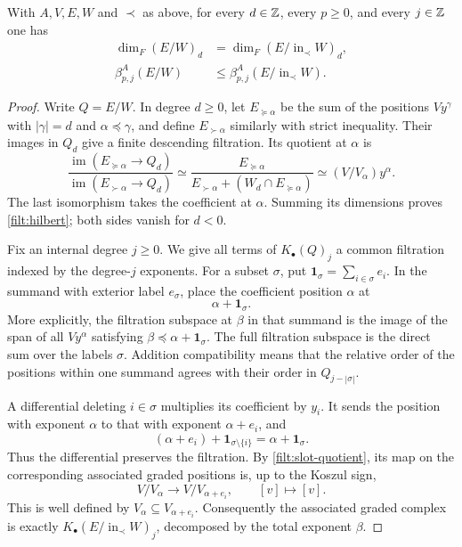 \begin{proposition}
\label{filt:comparison}
\label{filt:initial}
With $A,V,E,W$ and $\prec$ as above, for every $d\in\mathbb Z$, every
$p\geq0$, and every $j\in\mathbb Z$ one has
\begin{align}
 \dim_F(E/W)_d
    &=\dim_F(E/\operatorname{in}_{\prec}W)_d,
       \label{filt:hilbert}\\
 \beta^A_{p,j}(E/W)
    &\leq\beta^A_{p,j}(E/\operatorname{in}_{\prec}W).
       \label{filt:betti}
\end{align}
\end{proposition}

\begin{proof}
Write $Q=E/W$.  In degree $d\geq0$, let $E_{\succeq\alpha}$ be the
sum of the positions $Vy^\gamma$ with $|\gamma|=d$ and
$\alpha\preceq\gamma$, and define $E_{\succ\alpha}$ similarly with
strict inequality.  Their images in $Q_d$ give a finite descending
filtration.  Its quotient at $\alpha$ is
\begin{equation}
 \frac{\operatorname{im}(E_{\succeq\alpha}\to Q_d)}
      {\operatorname{im}(E_{\succ\alpha}\to Q_d)}
 \simeq
 \frac{E_{\succeq\alpha}}
      {E_{\succ\alpha}+(W_d\cap E_{\succeq\alpha})}
 \simeq (V/V_\alpha)y^\alpha.
 \label{filt:slot-quotient}
\end{equation}
The last isomorphism takes the coefficient at $\alpha$.  Summing its
dimensions proves \eqref{filt:hilbert}; both sides vanish for $d<0$.

Fix an internal degree $j\geq0$.  We give all terms of
$K_\bullet(Q)_j$ a common filtration indexed by the degree-$j$
exponents.  For a subset $\sigma$, put
$\mathbf{1}_\sigma=\sum_{i\in\sigma}e_i$.  In the summand with
exterior label $e_\sigma$, place the coefficient position $\alpha$ at
\[
                    \alpha+\mathbf{1}_\sigma.
\]
More explicitly, the filtration subspace at $\beta$ in that summand
is the image of the span of all $Vy^\alpha$ satisfying
$\beta\preceq\alpha+\mathbf{1}_\sigma$.  The full filtration subspace
is the direct sum over the labels $\sigma$.  Addition compatibility
means that the relative order of the positions within one summand
agrees with their order in $Q_{j-|\sigma|}$.

A differential deleting $i\in\sigma$ multiplies its coefficient by
$y_i$.  It sends the position with exponent $\alpha$ to that with
exponent $\alpha+e_i$, and
\[
 (\alpha+e_i)+\mathbf{1}_{\sigma\setminus\{i\}}
       =\alpha+\mathbf{1}_\sigma.
\]
Thus the differential preserves the filtration.  By
\eqref{filt:slot-quotient}, its map on the corresponding associated
graded positions is, up to the Koszul sign,
\[
 V/V_\alpha\longrightarrow V/V_{\alpha+e_i},
 \qquad [v]\longmapsto[v].
\]
This is well defined by $V_\alpha\subseteq V_{\alpha+e_i}$.
Consequently the associated graded complex is exactly
$K_\bullet(E/\operatorname{in}_{\prec}W)_j$, decomposed by the total
exponent $\beta$.


\end{proof}
